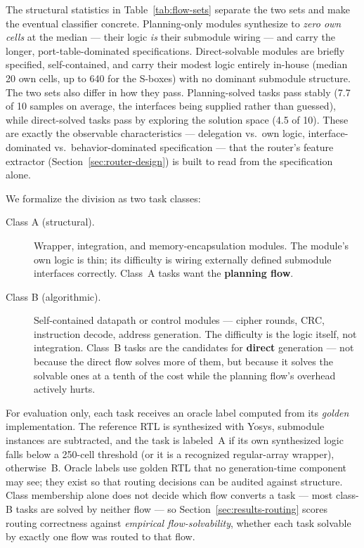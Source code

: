 The structural statistics in Table~\ref{tab:flow-sets} separate the
two sets and make the eventual classifier concrete.
Planning-only modules synthesize to \emph{zero own cells} at the median
--- their logic \emph{is} their submodule wiring --- and carry the
longer, port-table-dominated specifications. Direct-solvable modules
are briefly specified, self-contained, and carry their modest logic
entirely in-house (median 20 own cells, up to 640 for the S-boxes)
with no dominant submodule structure. The two sets also differ in how
they pass. Planning-solved tasks pass stably (7.7 of 10 samples on
average, the interfaces being supplied rather than guessed), while
direct-solved tasks pass by exploring the solution space (4.5 of 10).
These are exactly the observable characteristics --- delegation vs.\
own logic, interface-dominated vs.\ behavior-dominated specification
--- that the router's feature extractor
(Section~\ref{sec:router-design}) is built to read from the
specification alone.

We formalize the division as two task classes:

\begin{description}
  \item[Class A (structural).] Wrapper, integration, and memory-encapsulation
    modules. The module's own logic is thin; its difficulty is wiring
    externally defined submodule interfaces correctly. Class~A tasks want
    the \textbf{planning flow}.
  \item[Class B (algorithmic).] Self-contained datapath or control modules
    --- cipher rounds, CRC, instruction decode, address generation. The
    difficulty is the logic itself, not integration. Class~B tasks are
    the candidates for \textbf{direct} generation --- not because the direct flow solves
    more of them, but because it solves the solvable ones at a tenth of
    the cost while the planning flow's overhead actively hurts.
\end{description}

For evaluation only, each task receives an oracle label computed from its
\emph{golden} implementation. The reference RTL is synthesized with Yosys,
submodule instances are subtracted, and the task is labeled~A if its own
synthesized logic falls below a 250-cell threshold (or it is a recognized
regular-array wrapper), otherwise~B. Oracle labels use golden RTL that
no generation-time component may see; they exist so that routing
decisions can be audited against structure. Class membership alone
does not decide which flow converts a task --- most class-B tasks are
solved by neither flow --- so Section~\ref{sec:results-routing} scores
routing correctness against \emph{empirical flow-solvability}, whether
each task solvable by exactly one flow was routed to that flow.

